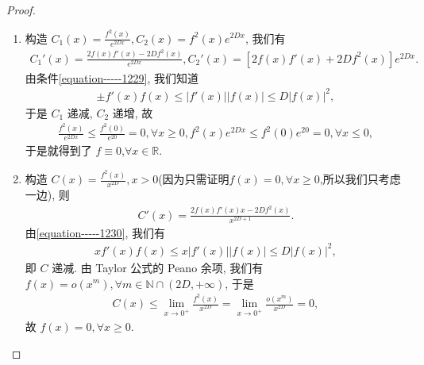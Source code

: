 \documentclass[../../main.tex]{subfiles}
\begin{document}
\begin{proof}
\begin{enumerate}
\item 构造 $C_1(x)=\frac{f^2(x)}{e^{2Dx}},C_2(x)=f^2(x)e^{2Dx}$, 我们有
\begin{align*}
C_1'(x)=\frac{2f(x)f'(x)-2Df^2(x)}{e^{2Dx}},C_2'(x)=[2f(x)f'(x)+2Df^2(x)]e^{2Dx}.
\end{align*}
由条件\eqref{equation-----1229}, 我们知道
\begin{align*}
\pm f'(x)f(x)\leqslant|f'(x)||f(x)|\leqslant D|f(x)|^2,
\end{align*}
于是 $C_1$ 递减, $C_2$ 递增, 故
\begin{align*}
\frac{f^2(x)}{e^{2Dx}}\leqslant\frac{f^2(0)}{e^{20}}=0,\forall x\geqslant0,f^2(x)e^{2Dx}\leqslant f^2(0)e^{20}=0,\forall x\leqslant0,
\end{align*}
于是就得到了 $f\equiv0$,$\forall x\in \mathbb{R}$.

\item 构造 $C(x)=\frac{f^2(x)}{x^{2D}},x>0$(因为只需证明$f(x)=0,\forall x\geqslant0$,所以我们只考虑一边), 则
\begin{align*}
C'(x)=\frac{2f(x)f'(x)x - 2Df^2(x)}{x^{2D + 1}}.
\end{align*}
由\eqref{equation-----1230}, 我们有
\begin{align*}
xf'(x)f(x)\leqslant x|f'(x)||f(x)|\leqslant D|f(x)|^2,
\end{align*}
即 $C$ 递减. 由 Taylor 公式的 Peano 余项, 我们有 $f(x)=o(x^m),\forall m\in\mathbb{N}\cap (2D,+\infty)$, 于是 
\begin{align*}
C(x)\leqslant \lim_{x\rightarrow 0^+} \frac{f^2(x)}{x^{2D}}=\lim_{x\rightarrow 0^+} \frac{o\left( x^m \right)}{x^{2D}}=0,
\end{align*}
故 $f(x)=0,\forall x\geqslant0$. 
\end{enumerate}

\end{proof}
\end{document}
